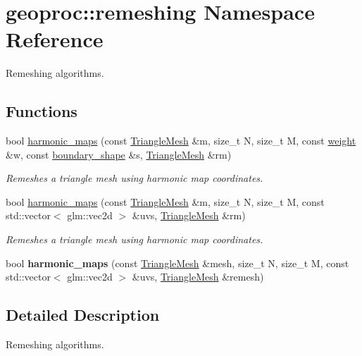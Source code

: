 \hypertarget{namespacegeoproc_1_1remeshing}{}\section{geoproc\+:\+:remeshing Namespace Reference}
\label{namespacegeoproc_1_1remeshing}


Remeshing algorithms.  


\subsection*{Functions}
\begin{DoxyCompactItemize}
\item 
bool \hyperlink{namespacegeoproc_1_1remeshing_a5ed68eab2cd304f825321c46cdcdc17e}{harmonic\+\_\+maps} (const \hyperlink{classgeoproc_1_1TriangleMesh}{Triangle\+Mesh} \&m, size\+\_\+t N, size\+\_\+t M, const \hyperlink{namespacegeoproc_a12e5a10581b53b9dd9a509127527f843}{weight} \&w, const \hyperlink{namespacegeoproc_a494da744a805b80f842402f0a806ccfc}{boundary\+\_\+shape} \&s, \hyperlink{classgeoproc_1_1TriangleMesh}{Triangle\+Mesh} \&rm)
\begin{DoxyCompactList}\small\item\em Remeshes a triangle mesh using harmonic map coordinates. \end{DoxyCompactList}\item 
bool \hyperlink{namespacegeoproc_1_1remeshing_af6de9f8e386ce37b161aa7f1f54cc47e}{harmonic\+\_\+maps} (const \hyperlink{classgeoproc_1_1TriangleMesh}{Triangle\+Mesh} \&m, size\+\_\+t N, size\+\_\+t M, const std\+::vector$<$ glm\+::vec2d $>$ \&uvs, \hyperlink{classgeoproc_1_1TriangleMesh}{Triangle\+Mesh} \&rm)
\begin{DoxyCompactList}\small\item\em Remeshes a triangle mesh using harmonic map coordinates. \end{DoxyCompactList}\item 
\mbox{\label{namespacegeoproc_1_1remeshing_aef7b7a38ada1b7581989f19fff09b226}} 
bool {\bfseries harmonic\+\_\+maps} (const \hyperlink{classgeoproc_1_1TriangleMesh}{Triangle\+Mesh} \&mesh, size\+\_\+t N, size\+\_\+t M, const std\+::vector$<$ glm\+::vec2d $>$ \&uvs, \hyperlink{classgeoproc_1_1TriangleMesh}{Triangle\+Mesh} \&remesh)
\end{DoxyCompactItemize}


\subsection{Detailed Description}
Remeshing algorithms. 

